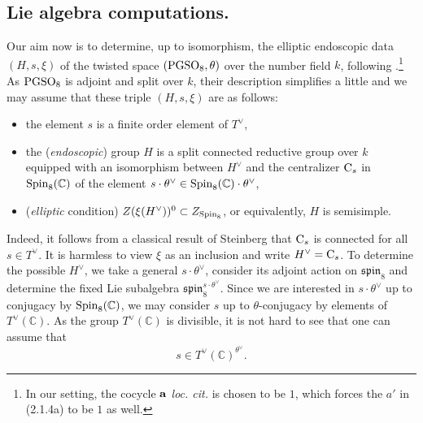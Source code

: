 \documentclass[11pt]{amsart}
\theoremstyle{plain}
\numberwithin{equation}{section}
\newcommand{\C}{\mathbb C}
\def\PGSO{{\rm PGSO}}
\def\Spin{{\rm Spin}}
\def\Spin{{\rm Spin}}
\def\C{{\bf C}}
\def\C{{\mathbb C}}
\begin{document}
 \subsection{\bf Lie algebra computations.} \label{SS:Lie alg}
\vskip 5pt

Our aim now is to determine, up to isomorphism, the elliptic endoscopic data $(H,s, \xi)$ 
of the twisted space $(\PGSO_8, \theta)$ over the number field $k$, 
following \cite[\S 2.1]{KSh}.\footnote{In our setting, the cocycle ${\bf a}$ {\it loc. cit.} is chosen to be $1$, 
which forces the $a'$ in (2.1.4a) to be $1$ as well.} 
As $\PGSO_8$ is adjoint and split over $k$, their description simplifies a little and 
we may assume that these triple $(H,s,\xi)$ are as follows: 
\begin{itemize}
\item the element $s$ is a finite order element of $T^{\vee}$,
\vskip 5pt
\item the ({\it endoscopic}) group $H$ is a split connected reductive group over $k$ equipped with an isomorphism 
between $H^{\vee}$ and the centralizer ${\rm C}_s$ in $\Spin_8(\C)$ of the element $s \cdot \theta^{\vee} \in \Spin_8(\C) \cdot \theta^{\vee}$,
\vskip 5pt
\item ({\it elliptic} condition) $Z(\xi(H^{\vee}))^0 \subset Z_{\Spin_8}$, or equivalently, $H$ is semisimple. 
\end{itemize}
Indeed, it follows from a classical result of Steinberg \cite[Chap. 1, \S 1.1, Pg. 14]{KSh} that ${\rm C}_s$ is connected
for all $s \in T^\vee$. It is harmless to view $\xi$ as an inclusion and write $H^\vee={\rm C}_s$.
 \vskip 5pt 
 To determine the possible $H^{\vee}$, we take a general $s \cdot \theta^{\vee}$, consider its adjoint action on $\mathfrak{spin}_8$ and determine the fixed Lie subalgebra $\mathfrak{spin}_8^{s \cdot \theta^{\vee}}$.  Since we are interested in $s \cdot \theta^{\vee}$ up to conjugacy by $\Spin_8(\C)$, we may consider $s$ up to $\theta$-conjugacy by elements of $T^{\vee}(\C)$. As the group $T^\vee(\C)$ is divisible, it is not hard to see that one can assume that 
 \[  s \in T^{\vee}(\C)^{\theta^{\vee}}. \]
 \vskip 5pt
 
\end{document}
